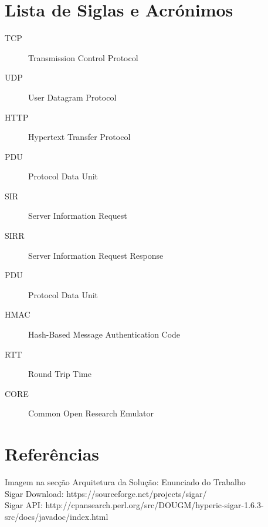 \documentclass{article}
\begin{document}
\section{Lista de Siglas e Acrónimos}
\begin{description}
    \item [TCP] Transmission Control Protocol
    \item [UDP] User Datagram Protocol
    \item [HTTP] Hypertext Transfer Protocol
    \item [PDU] Protocol Data Unit
    \item [SIR] Server Information Request
    \item [SIRR] Server Information Request Response
    \item [PDU] Protocol Data Unit
    \item [HMAC] Hash-Based Message Authentication Code
    \item [RTT] Round Trip Time
    \item [CORE] Common Open Research Emulator
\end{description}

\section{Referências}
Imagem na secção Arquitetura da Solução: Enunciado do Trabalho\\
Sigar Download: https://sourceforge.net/projects/sigar/\\
Sigar API: http://cpansearch.perl.org/src/DOUGM/hyperic-sigar-1.6.3-src/docs/javadoc/index.html\\
\end{document}
